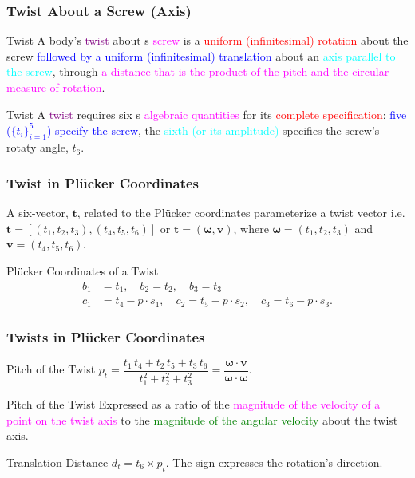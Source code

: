 \begin{frame}
	\frametitle{Twist About a Screw (Axis)}
		\begin{block}{Twist}
			A body's \textcolor{purple}{twist} about 
			s \textcolor{magenta}{screw} is a \textcolor{red}{uniform (infinitesimal) rotation} about the screw \textcolor{blue}{followed by a uniform (infinitesimal) translation} about an \textcolor{cyan}{axis parallel to the screw}, through \textcolor{magenta}{a distance that is the product of the pitch and the circular measure of rotation}.
		\end{block}	
		\begin{block}{Twist}
			A \textcolor{purple}{twist} requires six 
			s \textcolor{magenta}{algebraic quantities} for its  \textcolor{red}{complete specification}:  \textcolor{blue}{five ($\{t_i\}_{i=1}^5$) specify the screw}, the \textcolor{cyan}{sixth (or its amplitude)} specifies the \textcolor{light-blue}{screw's rotaty angle}, $t_6$.
		\end{block}	
\end{frame}

\begin{frame}
	\frametitle{Twist in Pl{\"u}cker Coordinates}
			\begin{definition}
				A six-vector, $\bm{t}$, related to the Pl{\"u}cker coordinates  parameterize a twist vector i.e. $\bm{t}=\left[(t_1, t_2, t_3), (t_4, t_5, t_6)\right]$ or $\bm{t}=\left(\bm{\omega}, \bm{v}\right)$, where $\bm{\omega}=(t_1, t_2, t_3)$ and $\bm{v}=(t_4, t_5, t_6)$.
			\end{definition}
	\begin{block}{Pl{\"u}cker Coordinates of a Twist}
		\begin{align}
			b_1 &= t_1, \quad b_2 = t_2, \quad b_3 = t_3 \\
			c_1 &= t_4 - p \cdot s_1, \quad c_2 = t_5-p\cdot s_2, \quad c_3 = t_6 - p\cdot s_3.
		\end{align}
\end{block}
\end{frame}

\begin{frame}
	\frametitle{Twists in Pl{\"u}cker Coordinates}
	\begin{block}{Pitch of the Twist}
		$p_t = \dfrac{t_1\,t_4 + t_2 \, t_5 + t_3\,t_6}{t_1^2+t_2^2+t_3^2}=\dfrac{\bm{\omega}\cdot \bm{v}}{\bm{\omega}\cdot \bm{\omega}}$.
	\end{block}
	\begin{block}{Pitch of the Twist}
		Expressed as a ratio of the \textcolor{magenta}{magnitude of the velocity of a point on the twist axis} to the \textcolor{green}{magnitude of the angular velocity} about the twist axis. 
	\end{block}	
	\begin{block}{Translation Distance}
		$d_t = t_6 \times p_t$.  The sign expresses the rotation's direction.
	\end{block}	
\end{frame}


